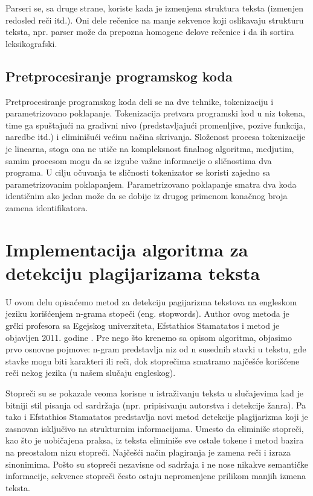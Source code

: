 \documentclass[a4paper]{article}
\begin{document}
\par Parseri se, sa druge strane, koriste kada je izmenjena struktura teksta (izmenjen redosled reči itd.). Oni dele rečenice na manje sekvence koji oslikavaju strukturu teksta, npr. parser može da prepozna homogene delove rečenice i da ih sortira leksikografski.

\subsection{Pretprocesiranje programskog koda}
\label{subsec:pretprocesiranje programskog koda}

Pretprocesiranje programskog koda deli se na dve tehnike, tokenizaciju i parametrizovano poklapanje. Tokenizacija pretvara programski kod u niz tokena, time ga spuštajući na gradivni nivo (predstavljajući promenljive, pozive funkcija, naredbe itd.) i eliminišući većinu načina skrivanja. Složenost procesa tokenizacije je linearna, stoga ona ne utiče na kompleksnost finalnog algoritma, medjutim, samim procesom mogu da se izgube važne informacije o sličnostima dva programa. U cilju očuvanja te sličnosti tokenizator se koristi zajedno sa parametrizovanim poklapanjem. Parametrizovano poklapanje smatra dva koda identičnim ako jedan može da se dobije iz drugog primenom konačnog broja zamena identifikatora.

\section{Implementacija algoritma za detekciju plagijarizama teksta}
\label{sec:implementacija algoritma za detekciju plagijarizama teksta}

U ovom delu opisaćemo metod za detekciju pagijarizma tekstova na engleskom jeziku korišćenjem n-grama stopeči (eng. stopwords). Author ovog metoda je grčki profesora sa Egejskog univerziteta, Efstathios Stamatatos i metod je objavljen 2011. godine \cite{stamatatos}. Pre nego što krenemo sa opisom algoritma, objasimo prvo osnovne pojmove: n-gram predstavlja niz od n susednih stavki u tekstu, gde stavke mogu  biti karakteri ili reči, dok stoprečima smatramo najčešće korišćene reči nekog  jezika (u našem slučaju engleskog).  

\par Stopreči su se pokazale veoma korisne u istraživanju teksta u slučajevima kad je  bitniji stil pisanja od sardržaja (npr. pripisivanju autorstva i detekcije žanra). Pa tako i Efstathios Stamatatos predstavlja novi metod detekcije plagijarizma  koji je zasnovan isključivo na strukturnim informacijama. Umesto da eliminiše  stopreči, kao što je uobičajena praksa, iz teksta eliminiše sve ostale tokene i metod  bazira na preostalom nizu stopreči. Najčešći način plagiranja je zamena reči i izraza sinonimima. Pošto su stopreči nezavisne od sadržaja i ne nose nikakve  semantičke informacije, sekvence stopreči često ostaju nepromenjene prilikom manjih izmena teksta.   
\end{document}
